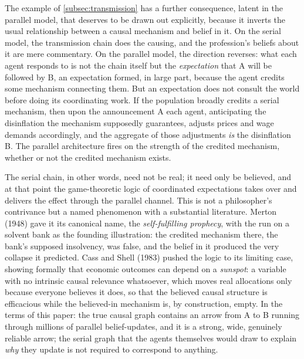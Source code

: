 \documentclass[11pt]{article}
\theoremstyle{definition}
\begin{document}
The example of \cref{subsec:transmission} has a further consequence, latent in the parallel model, that deserves to be drawn out explicitly, because it inverts the usual relationship between a causal mechanism and belief in it. On the serial model, the transmission chain does the causing, and the profession's beliefs about it are mere commentary. On the parallel model, the direction reverses: what each agent responds to is not the chain itself but the \emph{expectation} that A will be followed by B, an expectation formed, in large part, because the agent credits some mechanism connecting them. But an expectation does not consult the world before doing its coordinating work. If the population broadly credits a serial mechanism, then upon the announcement A each agent, anticipating the disinflation the mechanism supposedly guarantees, adjusts prices and wage demands accordingly, and the aggregate of those adjustments \emph{is} the disinflation B. The parallel architecture fires on the strength of the credited mechanism, whether or not the credited mechanism exists.

The serial chain, in other words, need not be real; it need only be believed, and at that point the game-theoretic logic of coordinated expectations takes over and delivers the effect through the parallel channel. This is not a philosopher's contrivance but a named phenomenon with a substantial literature. Merton (1948) gave it its canonical name, the \emph{self-fulfilling prophecy}, with the run on a solvent bank as the founding illustration: the credited mechanism there, the bank's supposed insolvency, was false, and the belief in it produced the very collapse it predicted. Cass and Shell (1983) pushed the logic to its limiting case, showing formally that economic outcomes can depend on a \emph{sunspot}: a variable with no intrinsic causal relevance whatsoever, which moves real allocations only because everyone believes it does, so that the believed causal structure is efficacious while the believed-in mechanism is, by construction, empty. In the terms of this paper: the true causal graph contains an arrow from A to B running through millions of parallel belief-updates, and it is a strong, wide, genuinely reliable arrow; the serial graph that the agents themselves would draw to explain \emph{why} they update is not required to correspond to anything.
\end{document}

